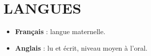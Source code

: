 \section{LANGUES}

\vspace{0.75cm}

\begin{itemize}
  \item \textbf{Français} : langue maternelle.
  \item \textbf{Anglais} : lu et écrit, niveau moyen à l'oral.
\end{itemize}
